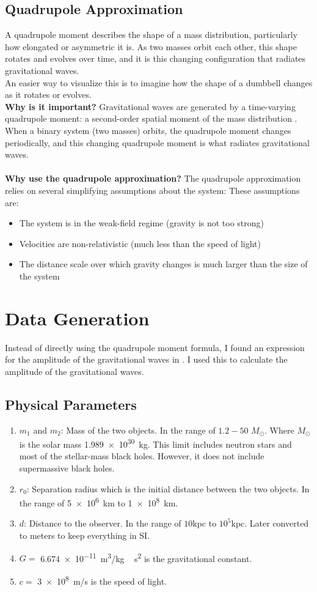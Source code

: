 \documentclass[12pt]{article}
\begin{document}
\subsection{Quadrupole Approximation}
A quadrupole moment describes the shape of a mass distribution, particularly how elongated or asymmetric it is. As two masses orbit each other, this shape rotates and evolves over time, and it is this changing configuration that radiates gravitational waves.
\\An easier way to visualize this is to imagine how the shape of a dumbbell changes as it rotates or evolves. 
\\
\textbf{Why is it important?}
Gravitational waves are generated by a time-varying quadrupole moment: a second-order spatial moment of the mass distribution \cite{CreightonGW}. When a binary system (two masses) orbits, the quadrupole moment changes periodically, and this changing quadrupole moment is what radiates gravitational waves.\\
\\
\textbf{Why use the quadrupole approximation?}
The quadrupole approximation relies on several simplifying assumptions about the system: 
These assumptions are:
\begin{itemize}
    \item The system is in the weak-field regime (gravity is not too strong)
    \item Velocities are non-relativistic (much less than the speed of light)
    \item The distance scale over which gravity changes is much larger than the size of the system
\end{itemize}


\section{Data Generation}
\label{generation}
Instead of directly using the quadrupole moment formula, I found an expression for the amplitude of the gravitational waves in \cite{CreightonGW}. I used this to calculate the amplitude of the gravitational waves.
\subsection{Physical Parameters}
\begin{enumerate}
    \item $m_1$ and $m_2$: Mass of the two objects. In the range of  $1.2 - 50$  $M_\odot$. Where $M_\odot$ is the solar mass \SI{1.989e30}{kg}. This limit includes neutron stars and most of the stellar-mass black holes. However, it does not include supermassive black holes.
    \item $r_0$: Separation radius which is the initial distance between the two objects. In the range of \SI{5e6}{km} to \SI{1e8}{km}. 
    \item $d$: Distance to the observer. In the range of $10$kpc to $10^5$kpc. Later converted to meters to keep everything in SI.
    \item $G=$ \SI{6.674e-11}{m^3/kg\,s^2} is the gravitational constant.
    \item $c=$ \SI{3e8}{m/s} is the speed of light.
\end{enumerate}
\end{document}
